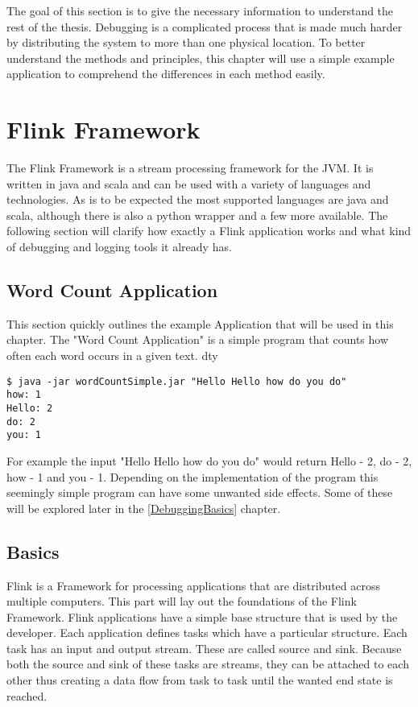 The goal of this section is to give the necessary information to understand the rest of the thesis. Debugging is a complicated process that is made much harder by distributing the system to more than one physical location. To better understand the methods and principles, this chapter will use a simple example application to comprehend the differences in each method easily.

\section{Flink Framework}
\label{flinkFramework}
The Flink Framework is a stream processing framework for the JVM. It is written in java and scala and can be used with a variety of languages and technologies. As is to be expected the most supported languages are java and scala, although there is also a python wrapper and a few more available. The following section will clarify how exactly a Flink application works and what kind of debugging and logging tools it already has.

\subsection{Word Count Application}
This section quickly outlines the example Application that will be used in this chapter. The "Word Count Application" is a simple program that counts how often each word occurs in a given text. dty
\begin{lstlisting}
$ java -jar wordCountSimple.jar "Hello Hello how do you do"
how: 1
Hello: 2
do: 2
you: 1
\end{lstlisting}
For example the input "Hello Hello how do you do" would return Hello - 2, do - 2, how - 1 and you - 1. Depending on the implementation of the program this seemingly simple program can have some unwanted side effects. Some of these will be explored later in the \ref{DebuggingBasics} chapter.

\subsection{Basics}
Flink is a Framework for processing applications that are distributed across multiple computers. This part will lay out the foundations of the Flink Framework.
Flink applications have a simple base structure that is used by the developer. Each application defines tasks which have a particular structure. Each task has an input and output stream. These are called source and sink. Because both the source and sink of these tasks are streams, they can be attached to each other thus creating a data flow from task to task until the wanted end state is reached.

